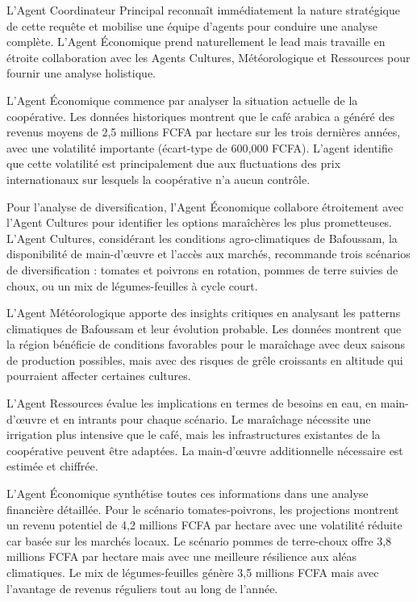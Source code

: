 L'Agent Coordinateur Principal reconnaît immédiatement la nature stratégique de cette requête et mobilise une équipe d'agents pour conduire une analyse complète. L'Agent Économique prend naturellement le lead mais travaille en étroite collaboration avec les Agents Cultures, Météorologique et Ressources pour fournir une analyse holistique.

L'Agent Économique commence par analyser la situation actuelle de la coopérative. Les données historiques montrent que le café arabica a généré des revenus moyens de 2,5 millions FCFA par hectare sur les trois dernières années, avec une volatilité importante (écart-type de 600,000 FCFA). L'agent identifie que cette volatilité est principalement due aux fluctuations des prix internationaux sur lesquels la coopérative n'a aucun contrôle.

Pour l'analyse de diversification, l'Agent Économique collabore étroitement avec l'Agent Cultures pour identifier les options maraîchères les plus prometteuses. L'Agent Cultures, considérant les conditions agro-climatiques de Bafoussam, la disponibilité de main-d'œuvre et l'accès aux marchés, recommande trois scénarios de diversification : tomates et poivrons en rotation, pommes de terre suivies de choux, ou un mix de légumes-feuilles à cycle court.

L'Agent Météorologique apporte des insights critiques en analysant les patterns climatiques de Bafoussam et leur évolution probable. Les données montrent que la région bénéficie de conditions favorables pour le maraîchage avec deux saisons de production possibles, mais avec des risques de grêle croissants en altitude qui pourraient affecter certaines cultures.

L'Agent Ressources évalue les implications en termes de besoins en eau, en main-d'œuvre et en intrants pour chaque scénario. Le maraîchage nécessite une irrigation plus intensive que le café, mais les infrastructures existantes de la coopérative peuvent être adaptées. La main-d'œuvre additionnelle nécessaire est estimée et chiffrée.

L'Agent Économique synthétise toutes ces informations dans une analyse financière détaillée. Pour le scénario tomates-poivrons, les projections montrent un revenu potentiel de 4,2 millions FCFA par hectare avec une volatilité réduite car basée sur les marchés locaux. Le scénario pommes de terre-choux offre 3,8 millions FCFA par hectare mais avec une meilleure résilience aux aléas climatiques. Le mix de légumes-feuilles génère 3,5 millions FCFA mais avec l'avantage de revenus réguliers tout au long de l'année.

